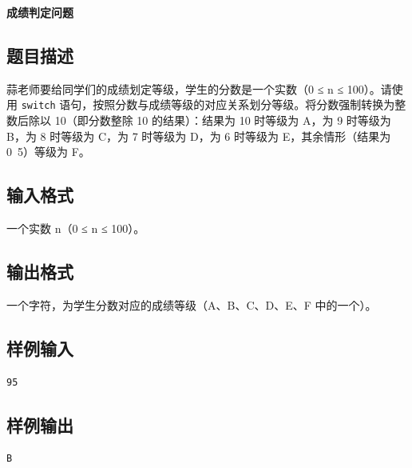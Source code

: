\documentclass{article}
\newcommand{\problemname}[1]{\begin{center}\Large\bfseries #1\end{center}}
\begin{document}
\problemname{成绩判定问题}

\subsection*{题目描述}
蒜老师要给同学们的成绩划定等级，学生的分数是一个实数（0 ≤ n ≤ 100）。请使用 \texttt{switch} 语句，按照分数与成绩等级的对应关系划分等级。将分数强制转换为整数后除以 10（即分数整除 10 的结果）：结果为 10 时等级为 A，为 9 时等级为 B，为 8 时等级为 C，为 7 时等级为 D，为 6 时等级为 E，其余情形（结果为 0~5）等级为 F。

\subsection*{输入格式}
一个实数 n（0 ≤ n ≤ 100）。

\subsection*{输出格式}
一个字符，为学生分数对应的成绩等级（A、B、C、D、E、F 中的一个）。

\subsection*{样例输入}
\begin{verbatim}
95
\end{verbatim}

\subsection*{样例输出}
\begin{verbatim}
B
\end{verbatim}
\end{document}
